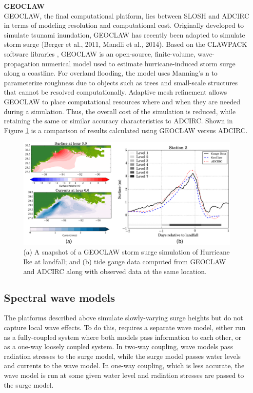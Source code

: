 \noindent\textbf{GEOCLAW} \\GEOCLAW, the final computational platform, lies between SLOSH and ADCIRC in terms of modeling resolution and computational cost. Originally developed to simulate tsunami inundation, GEOCLAW has recently been adapted to simulate storm surge (Berger et al., 2011, Mandli et al., 2014). Based on the CLAWPACK software libraries \citep{leveque2002a}, GEOCLAW is an open-source, finite-volume, wave-propagation numerical model used to estimate hurricane-induced storm surge along a coastline. For overland flooding, the model uses Manning's n to parameterize roughness due to objects such as trees and small-scale structures that cannot be resolved computationally. Adaptive mesh refinement allows GEOCLAW to place computational resources where and when they are needed during a simulation. Thus, the overall cost of the simulation is reduced, while retaining the same or similar accuracy characteristics to ADCIRC. Shown in Figure \ref{fig:GEOCLAW_ADCIRC_comparison} is a comparison of results calculated using GEOCLAW versus ADCIRC. 

\begin{figure}[htb]
    \centering
    \includegraphics[width=1.0\textwidth, angle = 0]{Figures/GEOCLAW_ADCIRC_comparison.png}
    \caption{(a) A snapshot of a GEOCLAW storm surge simulation of Hurricane Ike at landfall; and (b) tide gauge data computed from GEOCLAW and ADCIRC along with observed data at the same location. \citep{mandli2016a}}
    \label{fig:GEOCLAW_ADCIRC_comparison}
\end{figure}

\subsection{Spectral wave models}

The platforms described above simulate slowly-varying surge heights but do not capture local wave effects. To do this, requires a separate wave model, either run as a fully-coupled system where both models pass information to each other, or as a one-way loosely coupled system. In two-way coupling, wave models pass radiation stresses to the surge model, while the surge model passes water levels and currents to the wave model. In one-way coupling, which is less accurate, the wave model is run at some given water level and radiation stresses are passed to the surge model.

